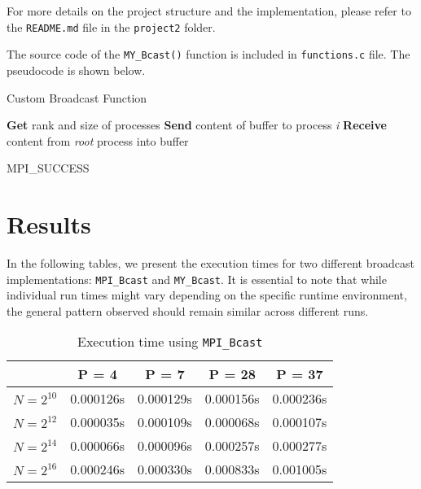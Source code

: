 \documentclass[12pt,a4paper]{article}
\begin{document}
For more details on the project structure and the implementation, please refer to the \texttt{README.md} file in the \texttt{project2} folder.

The source code of the \texttt{MY\_Bcast()} function is included in \texttt{functions.c} file. 
The pseudocode is shown below.
\begin{algorithm}
    \caption{Custom Broadcast Function}
    \begin{algorithmic}[1]
    \State \textbf{Get} rank and size of processes
                \State \textbf{Send} content of buffer to process \textit{i}
            \EndFor
        \Else
            \State \textbf{Receive} content from \textit{root} process into buffer
        \EndIf
        
        \State \Return MPI\_SUCCESS
    \EndProcedure
    \end{algorithmic}
\end{algorithm}


\section{Results}

In the following tables, 
we present the execution times for two different broadcast implementations: 
\texttt{MPI\_Bcast} and \texttt{MY\_Bcast}. 
It is essential to note that while individual run times might vary depending on the specific runtime environment, 
the general pattern observed should remain similar across different runs.

\begin{table}[!htb]
    \centering
    \begin{tabular}{|c|c|c|c|c|}
    \hline
     & P = 4 & P = 7 & P = 28 & P = 37 \\ 
    \hline
    $N = 2^{10}$ & 0.000126s & 0.000129s & 0.000156s & 0.000236s \\ 
    \hline
    $N = 2^{12}$ & 0.000035s & 0.000109s & 0.000068s & 0.000107s \\ 
    \hline
    $N = 2^{14}$ & 0.000066s & 0.000096s & 0.000257s & 0.000277s \\ 
    \hline
    $N = 2^{16}$ & 0.000246s & 0.000330s & 0.000833s & 0.001005s \\ 
    \hline
    \end{tabular}
    \caption{Execution time using \texttt{MPI\_Bcast}}
\end{table}
\end{document}
